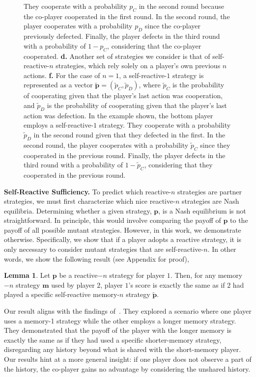 \documentclass{article}
\theoremstyle{definition}
\newtheorem{lemma}[theorem]{Lemma}
\begin{document}
\begin{figure}[h!]
{  They cooperate with a probability $p_C$ in the second round because the co-player
  cooperated in the first round. In the second round, the player cooperates with a
  probability $p_D$ since the co-player previously defected. Finally, the player
  defects in the third round with a probability of $1 - p_C$, considering that the
  co-player cooperated.
  \textbf{d.} Another set of strategies we consider is that of self-reactive-$n$
  strategies, which rely solely on a player's own previous $n$ actions.
  \textbf{f.} For the case of $n = 1$, a self-reactive-$1$ strategy is represented
  as a vector $\mathbf{\tilde{p}} = (\tilde{p}_C, \tilde{p}_D)$, where
  $\tilde{p}_C$ is the probability of cooperating given that the player's last
  action was cooperation, and $\tilde{p}_D$ is the probability of cooperating
  given that the player's last action was defection. In the example shown, the
  bottom player employs a self-reactive-$1$ strategy. They cooperate with a
  probability $\tilde{p}_D$ in the second round given that they defected in the
  first. In the second round, the player cooperates with a probability
  $\tilde{p}_C$ since they cooperated in the previous round. Finally, the player
  defects in the third round with a probability of $1 - \tilde{p}_C$, considering
  that they cooperated in the previous round.}
\end{figure}

\textbf{Self-Reactive Sufficiency.} To predict which reactive-$n$ strategies are
partner strategies, we must first characterize which nice reactive-$n$
strategies are Nash equilibria. Determining whether a given strategy,
$\mathbf{p}$, is a Nash equilibrium is not straightforward. In principle, this
would involve comparing the payoff of $\mathbf{p}$ to the payoff of all possible
mutant strategies. However, in this work, we demonstrate otherwise.
Specifically, we show that if a player adopts a reactive strategy, it is only
necessary to consider mutant strategies that are self-reactive-$n$. In other
words, we show the following result (see Appendix for proof),

\begin{lemma}\label{lemma:self_reactive_sufficiency}
  Let $\mathbf{p}$ be a reactive$-n$ strategy for player $1$. Then, for any
  memory$-n$ strategy $\mathbf{m}$ used by player $2$, player $1$'s score is
  exactly the same as if $2$ had played a specific self-reactive memory-$n$
  strategy $\mathbf{\tilde{p}}$.
\end{lemma}

Our result aligns with the findings of~\cite{press:PNAS:2012}. They explored a
scenario where one player uses a memory-1 strategy while the other employs a
longer memory strategy. They demonstrated that the payoff of the player with the
longer memory is exactly the same as if they had used a specific shorter-memory
strategy, disregarding any history beyond what is shared with the short-memory
player. Our results hint at a more general insight: if one player does not
observe a part of the history, the co-player gains no advantage by considering
the unshared history.
\end{document}
